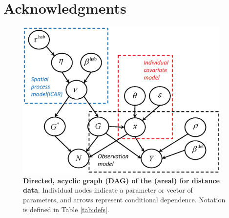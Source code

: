 \documentclass[10pt]{article}
\begin{document}
\section*{Acknowledgments}



\clearpage


\begin{figure}
\begin{center}
\includegraphics[width=0.95\textwidth]{DAG.eps}
\end{center}
\caption{{\bf Directed, acyclic graph (DAG) of the (areal) %
for distance data}. Individual nodes indicate a parameter or vector of parameters, and arrows represent conditional dependence. Notation is defined in Table \ref{tab:defs}.}
\label{fig:DAG}
\end{figure}
\clearpage
\end{document}
